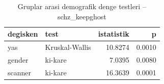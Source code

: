 \begin{table}[htbp]
  \centering
  \caption{Gruplar arasi demografik denge testleri -- schz\_keepghost}
  \label{tab:balance_schz_keepghost}
  \small
  \begin{tabular}{llrr}
    \toprule
    degisken & test & istatistik & p \\
    \midrule
    yas & Kruskal-Wallis & 10.8274 & 0.0010 \\
    gender & ki-kare & 7.0395 & 0.0080 \\
    scanner & ki-kare & 16.3639 & 0.0001 \\
    \bottomrule
  \end{tabular}
\end{table}
